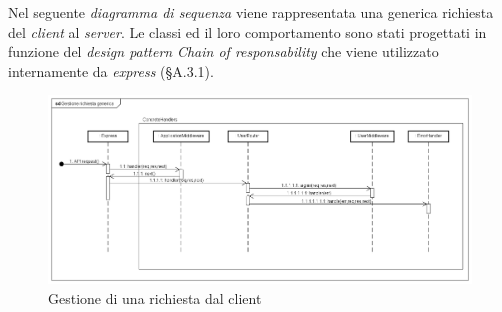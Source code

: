 Nel seguente \textit{diagramma di sequenza} viene rappresentata una generica richiesta del \textit{client} al \textit{server}. Le classi ed il loro comportamento sono stati progettati in funzione del \textit{design pattern} \textit{Chain of responsability} che viene utilizzato internamente da \textit{express} (§A.3.1).

\label{Gestione richiesta generica}
\begin{figure}[ht]
	\centering
	\includegraphics[scale=0.45]{UML/DiagrammiDiSequenza/Back-end/GestioneRichiestaGenerica.png}
	\caption{Gestione di una richiesta dal client}
\end{figure}
\FloatBarrier
